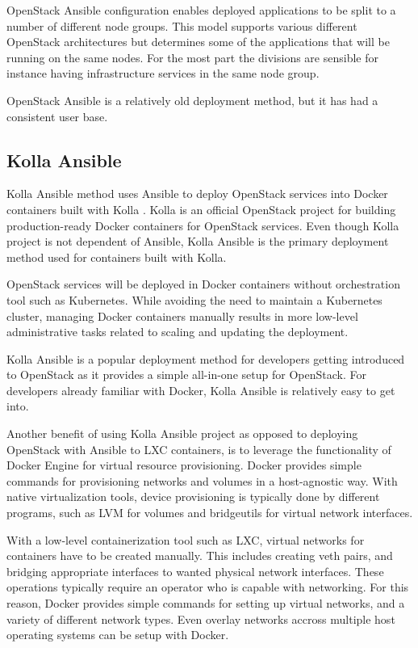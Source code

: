 \documentclass[officiallayout]{tktla}
\begin{document}
OpenStack Ansible configuration enables deployed applications to be split to a
number of different node groups. This model supports various different
OpenStack architectures but determines some of the applications that will be
running on the same nodes. For the most part the divisions are sensible for
instance having infrastructure services in the same node group.

OpenStack Ansible is a relatively old deployment method, but it has had a
consistent user base.

\subsection{Kolla Ansible}

Kolla Ansible \cite{kolla-ansible} method uses Ansible to deploy OpenStack
services into Docker containers built with Kolla \cite{kolla}. Kolla is an
official OpenStack project for building production-ready Docker containers for
OpenStack services. Even though Kolla project is not dependent of Ansible,
Kolla Ansible is the primary deployment method used for containers built with
Kolla.

OpenStack services will be deployed in Docker containers without orchestration
tool such as Kubernetes. While avoiding the need to maintain a Kubernetes
cluster, managing Docker containers manually results in more low-level
administrative tasks related to scaling and updating the deployment.

Kolla Ansible is a popular deployment method for developers getting introduced
to OpenStack as it provides a simple all-in-one setup for OpenStack. For
developers already familiar with Docker, Kolla Ansible is relatively easy to
get into.

Another benefit of using Kolla Ansible project as opposed to deploying
OpenStack with Ansible to LXC containers, is to leverage the functionality of
Docker Engine for virtual resource provisioning. Docker provides simple
commands for provisioning networks and volumes in a host-agnostic way. With
native virtualization tools, device provisioning is typically done by different
programs, such as LVM for volumes and bridgeutils for virtual network
interfaces.

With a low-level containerization tool such as LXC, virtual networks for
containers have to be created manually. This includes creating veth pairs, and
bridging appropriate interfaces to wanted physical network interfaces. These
operations typically require an operator who is capable with networking. For
this reason, Docker provides simple commands for setting up virtual networks,
and a variety of different network types. Even overlay networks accross
multiple host operating systems can be setup with Docker.
\end{document}
